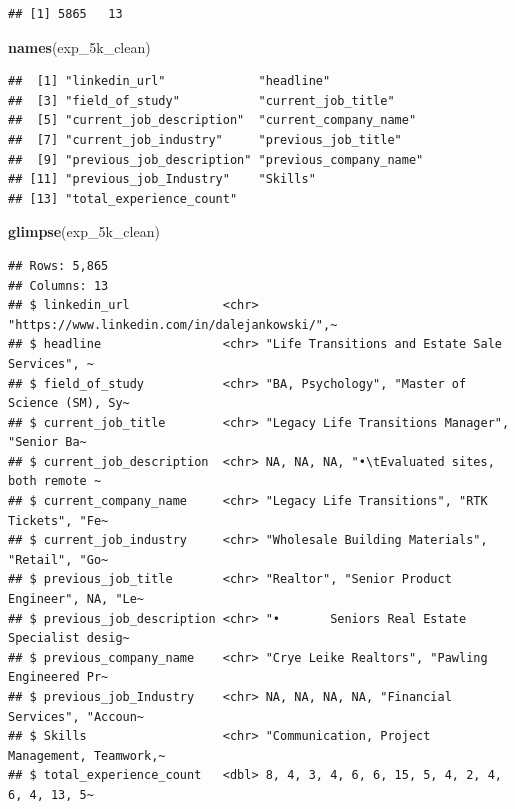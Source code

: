 \documentclass[
]{article}
\newenvironment{Shaded}{\begin{snugshade}}{\end{snugshade}}
\newcommand{\FunctionTok}[1]{\textcolor[rgb]{0.13,0.29,0.53}{\textbf{#1}}}
\newcommand{\NormalTok}[1]{#1}
\begin{document}
\begin{verbatim}
## [1] 5865   13
\end{verbatim}

\begin{Shaded}
\begin{Highlighting}[]
\FunctionTok{names}\NormalTok{(exp\_5k\_clean)}
\end{Highlighting}
\end{Shaded}

\begin{verbatim}
##  [1] "linkedin_url"             "headline"                
##  [3] "field_of_study"           "current_job_title"       
##  [5] "current_job_description"  "current_company_name"    
##  [7] "current_job_industry"     "previous_job_title"      
##  [9] "previous_job_description" "previous_company_name"   
## [11] "previous_job_Industry"    "Skills"                  
## [13] "total_experience_count"
\end{verbatim}

\begin{Shaded}
\begin{Highlighting}[]
\FunctionTok{glimpse}\NormalTok{(exp\_5k\_clean)}
\end{Highlighting}
\end{Shaded}

\begin{verbatim}
## Rows: 5,865
## Columns: 13
## $ linkedin_url             <chr> "https://www.linkedin.com/in/dalejankowski/",~
## $ headline                 <chr> "Life Transitions and Estate Sale Services", ~
## $ field_of_study           <chr> "BA, Psychology", "Master of Science (SM), Sy~
## $ current_job_title        <chr> "Legacy Life Transitions Manager", "Senior Ba~
## $ current_job_description  <chr> NA, NA, NA, "•\tEvaluated sites, both remote ~
## $ current_company_name     <chr> "Legacy Life Transitions", "RTK Tickets", "Fe~
## $ current_job_industry     <chr> "Wholesale Building Materials", "Retail", "Go~
## $ previous_job_title       <chr> "Realtor", "Senior Product Engineer", NA, "Le~
## $ previous_job_description <chr> "•       Seniors Real Estate Specialist desig~
## $ previous_company_name    <chr> "Crye Leike Realtors", "Pawling Engineered Pr~
## $ previous_job_Industry    <chr> NA, NA, NA, NA, "Financial Services", "Accoun~
## $ Skills                   <chr> "Communication, Project Management, Teamwork,~
## $ total_experience_count   <dbl> 8, 4, 3, 4, 6, 6, 15, 5, 4, 2, 4, 6, 4, 13, 5~
\end{verbatim}
\end{document}

